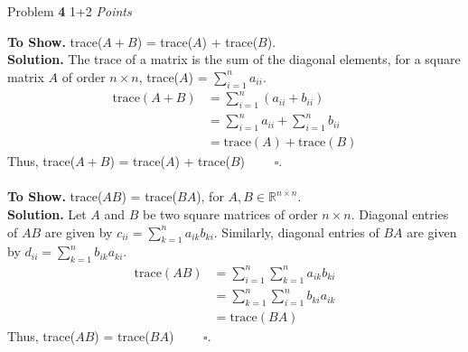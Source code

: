 \documentclass[11pt]{article}
\newcommand{\problem
}[2]{
\begin{mdframed}
    Problem \textbf{#1} \hfill #2
\end{mdframed}
}
\begin{document}
\problem{4}{1+2 \emph{Points}}
\textbf{To Show. } trace($A + B$) = trace($A$) + trace($B$).\\
\textbf{Solution. } The trace of a matrix is the sum of the diagonal elements, for a square matrix $A$ of order $n \times n$, trace($A$) = $\sum_{i=1}^{n} a_{ii}$.
\begin{align*}
	\text{trace}(A + B) & = \sum_{i=1}^{n} (a_{ii} + b_{ii})              \\
	                    & = \sum_{i=1}^{n} a_{ii} + \sum_{i=1}^{n} b_{ii} \\
	                    & = \text{trace}(A) + \text{trace}(B)
\end{align*} Thus, trace($A + B$) = trace($A$) + trace($B$) $\qquad \square$.
\\
\\
\textbf{To Show. } trace($AB$) = trace($BA$), for $A, B \in \mathbb{R}^{n \times n}$.\\
\textbf{Solution. }  Let $A$ and $B$ be two square matrices of order $n \times n$. Diagonal entries of $AB$ are given by $c_{ii} = \sum_{k=1}^{n} a_{ik}b_{ki}$. Similarly, diagonal entries of $BA$ are given by $d_{ii} = \sum_{k=1}^{n} b_{ik}a_{ki}$.\\
\begin{align*}
	\text{trace}(AB) & = \sum_{i=1}^{n} \sum_{k=1}^{n} a_{ik}b_{ki} \\
	                 & = \sum_{k=1}^{n} \sum_{i=1}^{n} b_{ki}a_{ik} \\
	                 & = \text{trace}(BA)
\end{align*} Thus, trace($AB$) = trace($BA$) $\qquad \square$.
\end{document}
